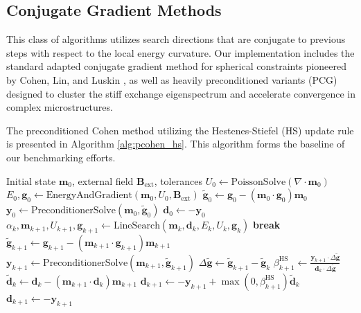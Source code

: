 \documentclass[10pt, a4paper, twocolumn]{article}
\begin{document}
\subsection{Conjugate Gradient Methods}
This class of algorithms utilizes search directions that are conjugate to previous steps with respect to the local energy curvature. Our implementation includes the standard adapted conjugate gradient method for spherical constraints pioneered by Cohen, Lin, and Luskin \cite{Cohen1989}, as well as heavily preconditioned variants (PCG) designed to cluster the stiff exchange eigenspectrum and accelerate convergence in complex microstructures.

The preconditioned Cohen method utilizing the Hestenes-Stiefel (HS) update rule is presented in Algorithm \ref{alg:pcohen_hs}. This algorithm forms the baseline of our benchmarking efforts.

\begin{algorithm}[H]
\caption{Preconditioned Cohen Conjugate Gradient Method (HS Update)}
\label{alg:pcohen_hs}
\begin{algorithmic}[1]
\REQUIRE Initial state $\mathbf{m}_0$, external field $\mathbf{B}_{\mathrm{ext}}$, tolerances
\STATE $U_0 \gets \text{PoissonSolve}(\nabla \cdot \mathbf{m}_0)$ 
\STATE $E_0, \mathbf{g}_0 \gets \text{EnergyAndGradient}(\mathbf{m}_0, U_0, \mathbf{B}_{\mathrm{ext}})$
\STATE $\tilde{\mathbf{g}}_0 \gets \mathbf{g}_0 - (\mathbf{m}_0 \cdot \mathbf{g}_0)\mathbf{m}_0$ 
\STATE $\mathbf{y}_0 \gets \text{PreconditionerSolve}(\mathbf{m}_0, \tilde{\mathbf{g}}_0)$ 
\STATE $\mathbf{d}_0 \gets -\mathbf{y}_0$
    \STATE $\alpha_k, \mathbf{m}_{k+1}, U_{k+1}, \mathbf{g}_{k+1} \gets \text{LineSearch}(\mathbf{m}_k, \mathbf{d}_k, E_k, U_k, \mathbf{g}_k)$
        \STATE \textbf{break}
    \ENDIF
    \STATE $\tilde{\mathbf{g}}_{k+1} \gets \mathbf{g}_{k+1} - (\mathbf{m}_{k+1} \cdot \mathbf{g}_{k+1})\mathbf{m}_{k+1}$ 
    \STATE $\mathbf{y}_{k+1} \gets \text{PreconditionerSolve}(\mathbf{m}_{k+1}, \tilde{\mathbf{g}}_{k+1})$ 
    \STATE $\Delta\tilde{\mathbf{g}} \gets \tilde{\mathbf{g}}_{k+1} - \tilde{\mathbf{g}}_k$
    \STATE $\beta_{k+1}^{\text{HS}} \gets \frac{\mathbf{y}_{k+1} \cdot \Delta\tilde{\mathbf{g}}}{\mathbf{d}_k \cdot \Delta\tilde{\mathbf{g}}}$ 
    \STATE $\tilde{\mathbf{d}}_k \gets \mathbf{d}_k - (\mathbf{m}_{k+1} \cdot \mathbf{d}_k)\mathbf{m}_{k+1}$ 
    \STATE $\mathbf{d}_{k+1} \gets -\mathbf{y}_{k+1} + \max(0, \beta_{k+1}^{\text{HS}}) \tilde{\mathbf{d}}_k$
        \STATE $\mathbf{d}_{k+1} \gets -\mathbf{y}_{k+1}$ 
    \ENDIF
\ENDFOR
\end{algorithmic}
\end{algorithm}
\end{document}
